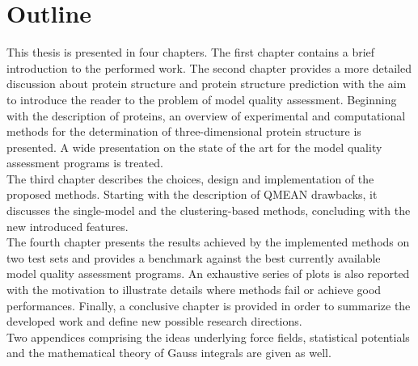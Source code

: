 \section{Outline}
\label{sec:outline}
This thesis is presented in four chapters. The first chapter contains a brief introduction to the performed work. The second chapter provides a more detailed discussion about protein structure and protein structure prediction with the aim to introduce the reader to the problem of model quality assessment. Beginning with the description of proteins, an overview of experimental and computational methods for the determination of three-\-di\-men\-sio\-nal protein structure is presented. A wide presentation on the state of the art for the model quality assessment programs is treated.\\
The third chapter describes the choices, design and implementation of the proposed methods. Starting with the description of QMEAN drawbacks, it discusses the single-model and the clustering-based methods, concluding with the new introduced features.\\
The fourth chapter presents the results achieved by the implemented methods on two test sets and provides a benchmark against the best currently available model quality assessment programs. An exhaustive series of plots is also reported with the motivation to illustrate details where methods fail or achieve good performances. Finally, a conclusive chapter is provided in order to summarize the developed work and define new possible research directions.\\
Two appendices comprising the ideas underlying force fields, statistical potentials and the mathematical theory of Gauss integrals are given as well.

\cleardoublepage



